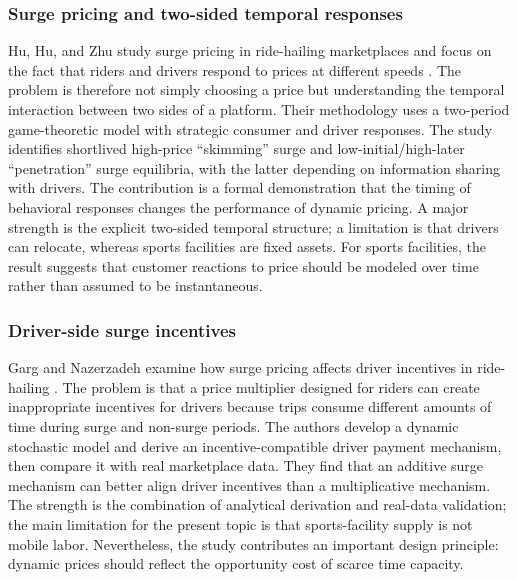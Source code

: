 \subsubsection{Surge pricing and two-sided temporal responses}
Hu, Hu, and Zhu study surge pricing in ride-hailing marketplaces and focus on the fact that riders and drivers respond to prices at different speeds \cite{r2}. The problem is therefore not simply choosing a price but understanding the temporal interaction between two sides of a platform. Their methodology uses a two-period game-theoretic model with strategic consumer and driver responses. The study identifies shortlived high-price ``skimming'' surge and low-initial/high-later ``penetration'' surge equilibria, with the latter depending on information sharing with drivers. The contribution is a formal demonstration that the timing of behavioral responses changes the performance of dynamic pricing. A major strength is the explicit two-sided temporal structure; a limitation is that drivers can relocate, whereas sports facilities are fixed assets. For sports facilities, the result suggests that customer reactions to price should be modeled over time rather than assumed to be instantaneous.

\subsubsection{Driver-side surge incentives}
Garg and Nazerzadeh examine how surge pricing affects driver incentives in ride-hailing \cite{r3}. The problem is that a price multiplier designed for riders can create inappropriate incentives for drivers because trips consume different amounts of time during surge and non-surge periods. The authors develop a dynamic stochastic model and derive an incentive-compatible driver payment mechanism, then compare it with real marketplace data. They find that an additive surge mechanism can better align driver incentives than a multiplicative mechanism. The strength is the combination of analytical derivation and real-data validation; the main limitation for the present topic is that sports-facility supply is not mobile labor. Nevertheless, the study contributes an important design principle: dynamic prices should reflect the opportunity cost of scarce time capacity.

